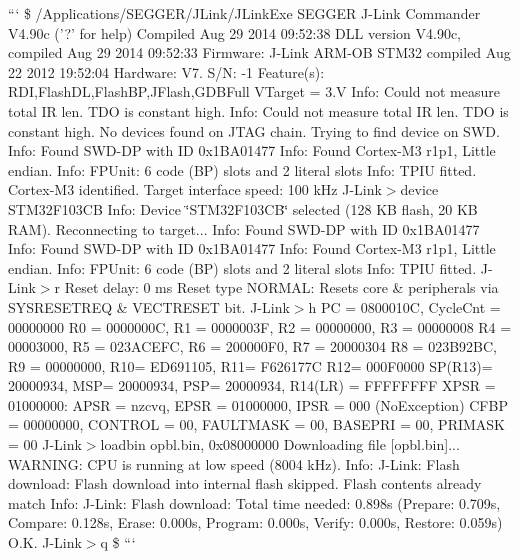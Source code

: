 ``` \$ /\+Applications/\+S\+E\+G\+G\+E\+R/\+J\+Link/\+J\+Link\+Exe S\+E\+G\+G\+E\+R J-\/\+Link Commander V4.\+90c ('?' for help) Compiled Aug 29 2014 09\+:52\+:38 D\+L\+L version V4.\+90c, compiled Aug 29 2014 09\+:52\+:33 Firmware\+: J-\/\+Link A\+R\+M-\/\+O\+B S\+T\+M32 compiled Aug 22 2012 19\+:52\+:04 Hardware\+: V7. S/\+N\+: -\/1 Feature(s)\+: R\+D\+I,Flash\+D\+L,Flash\+B\+P,J\+Flash,G\+D\+B\+Full V\+Target = 3.\+V Info\+: Could not measure total I\+R len. T\+D\+O is constant high. Info\+: Could not measure total I\+R len. T\+D\+O is constant high. No devices found on J\+T\+A\+G chain. Trying to find device on S\+W\+D. Info\+: Found S\+W\+D-\/\+D\+P with I\+D 0x1\+B\+A01477 Info\+: Found Cortex-\/\+M3 r1p1, Little endian. Info\+: F\+P\+Unit\+: 6 code (B\+P) slots and 2 literal slots Info\+: T\+P\+I\+U fitted. Cortex-\/\+M3 identified. Target interface speed\+: 100 k\+Hz J-\/\+Link$>$device S\+T\+M32\+F103\+C\+B Info\+: Device \char`\"{}\+S\+T\+M32\+F103\+C\+B\char`\"{} selected (128 K\+B flash, 20 K\+B R\+A\+M). Reconnecting to target... Info\+: Found S\+W\+D-\/\+D\+P with I\+D 0x1\+B\+A01477 Info\+: Found S\+W\+D-\/\+D\+P with I\+D 0x1\+B\+A01477 Info\+: Found Cortex-\/\+M3 r1p1, Little endian. Info\+: F\+P\+Unit\+: 6 code (B\+P) slots and 2 literal slots Info\+: T\+P\+I\+U fitted. J-\/\+Link$>$r Reset delay\+: 0 ms Reset type N\+O\+R\+M\+A\+L\+: Resets core \& peripherals via S\+Y\+S\+R\+E\+S\+E\+T\+R\+E\+Q \& V\+E\+C\+T\+R\+E\+S\+E\+T bit. J-\/\+Link$>$h P\+C = 0800010\+C, Cycle\+Cnt = 00000000 R0 = 0000000\+C, R1 = 0000003\+F, R2 = 00000000, R3 = 00000008 R4 = 00003000, R5 = 023\+A\+C\+E\+F\+C, R6 = 200000\+F0, R7 = 20000304 R8 = 023\+B92\+B\+C, R9 = 00000000, R10= E\+D691105, R11= F626177\+C R12= 000\+F0000 S\+P(\+R13)= 20000934, M\+S\+P= 20000934, P\+S\+P= 20000934, R14(\+L\+R) = F\+F\+F\+F\+F\+F\+F\+F X\+P\+S\+R = 01000000\+: A\+P\+S\+R = nzcvq, E\+P\+S\+R = 01000000, I\+P\+S\+R = 000 (No\+Exception) C\+F\+B\+P = 00000000, C\+O\+N\+T\+R\+O\+L = 00, F\+A\+U\+L\+T\+M\+A\+S\+K = 00, B\+A\+S\+E\+P\+R\+I = 00, P\+R\+I\+M\+A\+S\+K = 00 J-\/\+Link$>$loadbin opbl.\+bin, 0x08000000 Downloading file \mbox{[}opbl.\+bin\mbox{]}... W\+A\+R\+N\+I\+N\+G\+: C\+P\+U is running at low speed (8004 k\+Hz). Info\+: J-\/\+Link\+: Flash download\+: Flash download into internal flash skipped. Flash contents already match Info\+: J-\/\+Link\+: Flash download\+: Total time needed\+: 0.\+898s (Prepare\+: 0.\+709s, Compare\+: 0.\+128s, Erase\+: 0.\+000s, Program\+: 0.\+000s, Verify\+: 0.\+000s, Restore\+: 0.\+059s) O.\+K. J-\/\+Link$>$q \$ ``` 